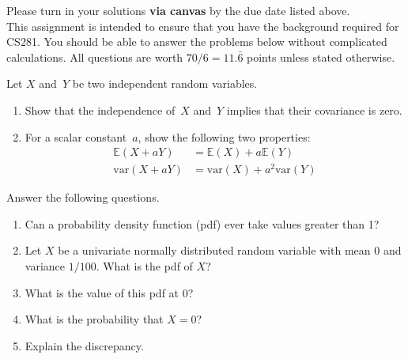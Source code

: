 \documentclass{harvardml}
\newcommand{\E}{\mathbb{E}}
\newcommand{\var}{\text{var}}
\begin{document}
\noindent Please turn in your solutions \textbf{via canvas} by the due date listed above.
\\

\noindent This assignment is intended to ensure that you have the background required for CS281. You should be able to answer the problems below without complicated calculations. All questions are worth $70/6 = 11.\bar{6}$ points unless stated otherwise.

\begin{problem}
Let $X$ and~$Y$ be two independent random variables.

\begin{enumerate}[label=(\alph*)]
\item Show that the independence of~$X$ and~$Y$ implies that their
covariance is zero.

\item For a scalar constant~$a$, show the following two properties:
\begin{align*}
  \E(X + aY) &= \E(X) + a\E(Y)\\
  \var(X + aY) &= \var(X) + a^2\var(Y)
\end{align*}
\end{enumerate}
\end{problem}



\begin{problem}[Densities]
Answer the following questions.
\begin{enumerate}[label=(\alph*)]
  \item Can a probability density function (pdf) ever take values greater than 1?
  \item Let $X$ be a univariate normally distributed random variable with mean 0 and variance $1/100$. What is the pdf of $X$?
  \item What is the value of this pdf at 0?
  \item What is the probability that $X = 0$?
  \item Explain the discrepancy.
\end{enumerate}
\end{problem}

\end{document}
